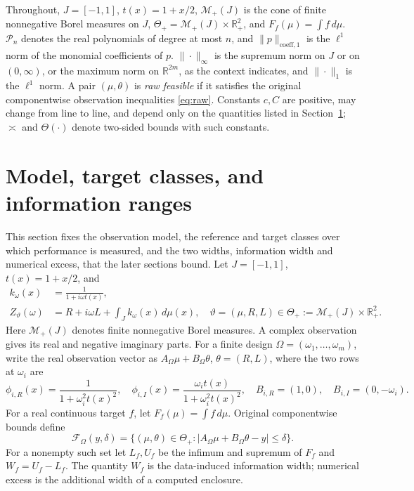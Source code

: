 \documentclass[10pt]{amsart}
\theoremstyle{definition}
\theoremstyle{remark}
\theoremstyle{plain}
\newcommand{\R}{\mathbb R}
\newcommand{\dd}{\,d}
\newcommand{\Mplus}{\mathcal M_+(J)}
\newcommand{\ThetaAll}{\Theta_+}
\newcommand{\F}{\mathcal F}
\newcommand{\Pp}{\mathcal P}
\begin{document}
Throughout, $J=[-1,1]$, $t(x)=1+x/2$, $\Mplus$ is the cone of finite nonnegative Borel measures on $J$, $\ThetaAll=\Mplus\times\R_+^2$, and $F_f(\mu)=\int f\dd\mu$. $\Pp_n$ denotes the real polynomials of degree at most $n$, and $\|p\|_{\mathrm{coeff},1}$ is the $\ell^1$ norm of the monomial coefficients of $p$. $\|\cdot\|_\infty$ is the supremum norm on $J$ or on $(0,\infty)$, or the maximum norm on $\R^{2m}$, as the context indicates, and $\|\cdot\|_1$ is the $\ell^1$ norm. A pair $(\mu,\theta)$ is \emph{raw feasible} if it satisfies the original componentwise observation inequalities \eqref{eq:raw}. Constants $c,C$ are positive, may change from line to line, and depend only on the quantities listed in Section~\ref{sec:model}; $\asymp$ and $\Theta(\cdot)$ denote two-sided bounds with such constants.

\section{Model, target classes, and information ranges}\label{sec:model}
This section fixes the observation model, the reference and target classes over which performance is measured, and the two widths, information width and numerical excess, that the later sections bound. Let $J=[-1,1]$, $t(x)=1+x/2$, and
\begin{equation}\label{eq:model}
 \begin{aligned}
 k_\omega(x)&=\frac1{1+i\omega t(x)},\\
 Z_\vartheta(\omega)&=R+i\omega L+\int_J k_\omega(x)\dd\mu(x),
 \quad\vartheta=(\mu,R,L)\in\ThetaAll:=\Mplus\times\R_+^2.
 \end{aligned}
\end{equation}
Here $\Mplus$ denotes finite nonnegative Borel measures. A complex observation gives its real and negative imaginary parts. For a finite design $\Omega=(\omega_1,\ldots,\omega_m)$, write the real observation vector as $A_\Omega\mu+B_\Omega\theta$, $\theta=(R,L)$, where the two rows at $\omega_i$ are
\[
 \phi_{i,R}(x)=\frac1{1+\omega_i^2t(x)^2},\quad
 \phi_{i,I}(x)=\frac{\omega_it(x)}{1+\omega_i^2t(x)^2},\quad
 B_{i,R}=(1,0),\quad B_{i,I}=(0,-\omega_i).
\]
For a real continuous target $f$, let $F_f(\mu)=\int f\dd\mu$. Original componentwise bounds define
\begin{equation}\label{eq:raw}
 \F_\Omega(y,\delta)=
 \{(\mu,\theta)\in\ThetaAll:|A_\Omega\mu+B_\Omega\theta-y|\le\delta\}.
\end{equation}
For a nonempty such set let $L_f,U_f$ be the infimum and supremum of $F_f$ and $W_f=U_f-L_f$. The quantity $W_f$ is the data-induced information width; numerical excess is the additional width of a computed enclosure.
\end{document}
